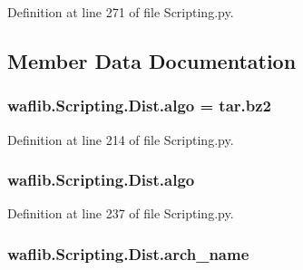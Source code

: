 Definition at line 271 of file Scripting.\+py.



\subsection{Member Data Documentation}
\subsubsection[{\texorpdfstring{algo}{algo}}]{ waflib.\+Scripting.\+Dist.\+algo = \textquotesingle{}tar.\+bz2\textquotesingle{}\hspace{0.3cm}{\ttfamily [static]}}\hypertarget{classwaflib_1_1_scripting_1_1_dist_a1d7119b0d0bba44b5d696ed735ef12c4}{}\label{classwaflib_1_1_scripting_1_1_dist_a1d7119b0d0bba44b5d696ed735ef12c4}


Definition at line 214 of file Scripting.\+py.

\subsubsection[{\texorpdfstring{algo}{algo}}]{\setlength{\rightskip}{0pt plus 5cm}waflib.\+Scripting.\+Dist.\+algo}\hypertarget{classwaflib_1_1_scripting_1_1_dist_a83c6042f94bda0555405c8bebab637ea}{}\label{classwaflib_1_1_scripting_1_1_dist_a83c6042f94bda0555405c8bebab637ea}


Definition at line 237 of file Scripting.\+py.

\subsubsection[{\texorpdfstring{arch\+\_\+name}{arch_name}}]{\setlength{\rightskip}{0pt plus 5cm}waflib.\+Scripting.\+Dist.\+arch\+\_\+name}\hypertarget{classwaflib_1_1_scripting_1_1_dist_a5ba9c50be1e311604df0353b280ce397}{}\label{classwaflib_1_1_scripting_1_1_dist_a5ba9c50be1e311604df0353b280ce397}


